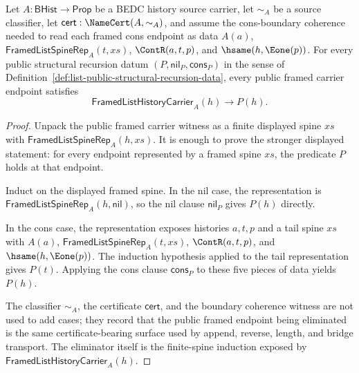 \begin{theorem}
\label{thm:list-public-structural-recursion-principle}
Let $A:\mathsf{BHist}\to\mathsf{Prop}$ be a BEDC history source carrier, let
$\sim_A$ be a source classifier, let $\mathsf{cert}:\NameCert(A,\sim_A)$, and
assume the cons-boundary coherence needed to read each framed cons endpoint as
data $A(a)$, $\mathsf{FramedListSpineRep}_A(t,xs)$, $\ContR(a,t,p)$, and
$\hsame(h,\Eone(p))$. For every public structural recursion datum
$(P,\mathsf{nil}_P,\mathsf{cons}_P)$ in the sense of
Definition~\ref{def:list-public-structural-recursion-data}, every public
framed carrier endpoint satisfies
$$
\mathsf{FramedListHistoryCarrier}_A(h)\to P(h).
$$
\end{theorem}
\begin{proof}
Unpack the public framed carrier witness as a finite displayed spine $xs$ with
$\mathsf{FramedListSpineRep}_A(h,xs)$. It is enough to prove the stronger
displayed statement: for every endpoint represented by a framed spine $xs$, the
predicate $P$ holds at that endpoint.

Induct on the displayed framed spine. In the nil case, the representation is
$\mathsf{FramedListSpineRep}_A(h,\mathsf{nil})$, so the nil clause
$\mathsf{nil}_P$ gives $P(h)$ directly.

In the cons case, the representation exposes histories $a,t,p$ and a tail
spine $xs$ with $A(a)$, $\mathsf{FramedListSpineRep}_A(t,xs)$,
$\ContR(a,t,p)$, and $\hsame(h,\Eone(p))$. The induction hypothesis applied to
the tail representation gives $P(t)$. Applying the cons clause
$\mathsf{cons}_P$ to these five pieces of data yields $P(h)$.

The classifier $\sim_A$, the certificate $\mathsf{cert}$, and the boundary
coherence witness are not used to add cases; they record that the public
framed endpoint being eliminated is the same certificate-bearing surface used
by append, reverse, length, and bridge transport. The eliminator itself is the
finite-spine induction exposed by
$\mathsf{FramedListHistoryCarrier}_A(h)$.
\end{proof}
